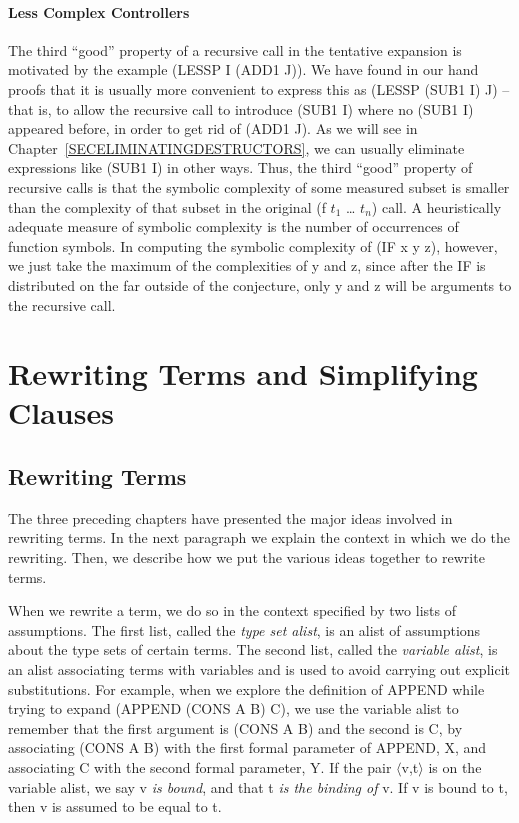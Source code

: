 \documentclass[10pt]{book}
\begin{document}
\subsubsection{Less Complex Controllers}
The third ``good'' property of a recursive call in the tentative expansion
is motivated by the example (LESSP I (ADD1 J)).  We have
found in our hand proofs that it is usually more convenient to express
this as (LESSP (SUB1 I) J) -- that is, to allow the recursive call to introduce
(SUB1 I) where no (SUB1 I) appeared before, in order to get rid of (ADD1 J).
As we will see in Chapter~\ref{SECELIMINATINGDESTRUCTORS},
we can usually eliminate expressions like (SUB1 I) in other ways.  Thus,
the third ``good'' property of recursive calls is that the symbolic complexity
of some measured subset is smaller than the complexity of that subset in
the original (f $t_{1}$ \ldots{} $t_{n}$) call.  A heuristically adequate measure
of symbolic complexity is the number of occurrences of
function symbols.  In
computing the symbolic complexity of (IF x y z), however, we just take the
maximum of the complexities of y and z, since after the IF is distributed on the
far outside of the conjecture, only y and z will be arguments to the recursive
call.

\chapter{Rewriting Terms and Simplifying Clauses}
\pagestyle{headings}
\label{SECREWRITESIMPLIFY}
\section{Rewriting Terms}
The three preceding chapters have presented the major ideas
involved in rewriting terms.  In the next paragraph we explain the
context in which we do the rewriting.  Then, we describe how we
put the various ideas together to rewrite terms.

When we rewrite a term, we do so in the context specified by two lists of
assumptions.  The first list, called the \emph{type set alist}, 
is an alist of assumptions about the type sets
of certain terms.  The second list,
called the \emph{variable alist}, is
an alist associating terms with variables
and is used to avoid carrying out explicit substitutions.  For example,
when we explore the definition of APPEND while trying to expand
(APPEND (CONS A B) C), we use the variable alist to remember that the first
argument is (CONS A B) and the second is C, by associating (CONS A B) with
the first formal parameter of APPEND, X, and associating C with the
second formal parameter, Y.  If the pair $\langle$v,t$\rangle$ is on the variable alist, we
say v \emph{is bound}, and that t \emph{is the binding of} v.
If v is bound to t, then v is assumed to be equal to t.
\end{document}
